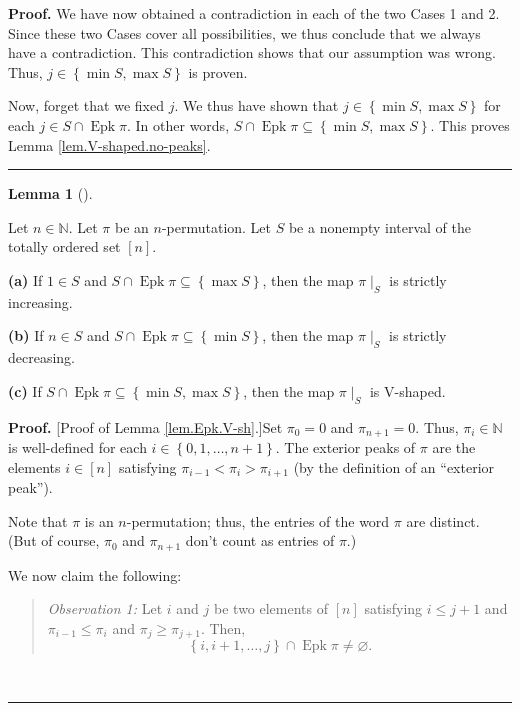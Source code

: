 \documentclass[numbers=enddot,12pt,final,onecolumn,notitlepage]{scrartcl}%
\theoremstyle{definition}
\newtheorem{lem}[theo]{Lemma}
\newenvironment{lemma}[1][]
{\begin{lem}[#1]\begin{leftbar}}
{\end{leftbar}\end{lem}}
\newenvironment{statement}{\begin{quote}}{\end{quote}}
\newenvironment{proof}[1][Proof]{\noindent\textbf{#1.} }{\ \rule{0.5em}{0.5em}}
\newenvironment{verlong}{}{}
\begin{document}
\begin{verlong}
\begin{proof}
We have now obtained a contradiction in each of the two Cases 1 and 2. Since
these two Cases cover all possibilities, we thus conclude that we always have
a contradiction. This contradiction shows that our assumption was wrong. Thus,
$j\in\left\{  \min S,\max S\right\}  $ is proven.

Now, forget that we fixed $j$. We thus have shown that $j\in\left\{  \min
S,\max S\right\}  $ for each $j\in S\cap\operatorname{Epk}\pi$. In other
words, $S\cap\operatorname{Epk}\pi\subseteq\left\{  \min S,\max S\right\}  $.
This proves Lemma \ref{lem.V-shaped.no-peaks}.
\end{proof}

\begin{lemma}
\label{lem.Epk.V-sh}Let $n\in\mathbb{N}$. Let $\pi$ be an $n$-permutation. Let
$S$ be a nonempty interval of the totally ordered set $\left[  n\right]  $.

\textbf{(a)} If $1\in S$ and $S\cap\operatorname{Epk}\pi\subseteq\left\{
\max S\right\}  $, then the map $\pi\mid_{S}$ is strictly increasing.

\textbf{(b)} If $n\in S$ and $S\cap\operatorname{Epk}\pi\subseteq\left\{
\min S\right\}  $, then the map $\pi\mid_{S}$ is strictly decreasing.

\textbf{(c)} If $S\cap\operatorname{Epk}\pi\subseteq\left\{  \min S,\max
S\right\}  $, then the map $\pi\mid_{S}$ is V-shaped.
\end{lemma}

\begin{proof}
[Proof of Lemma \ref{lem.Epk.V-sh}.]Set $\pi_{0}=0$ and $\pi_{n+1}=0$. Thus,
$\pi_{i}\in\mathbb{N}$ is well-defined for each $i\in\left\{  0,1,\ldots
,n+1\right\}  $. The exterior peaks of $\pi$ are the elements $i\in\left[
n\right]  $ satisfying $\pi_{i-1}<\pi_{i}>\pi_{i+1}$ (by the definition of an
\textquotedblleft exterior peak\textquotedblright).

Note that $\pi$ is an $n$-permutation; thus, the entries of the word $\pi$ are
distinct. (But of course, $\pi_{0}$ and $\pi_{n+1}$ don't count as entries of
$\pi$.)

We now claim the following:

\begin{statement}
\textit{Observation 1:} Let $i$ and $j$ be two elements of $\left[  n\right]
$ satisfying $i\leq j+1$ and $\pi_{i-1}\leq\pi_{i}$ and $\pi_{j}\geq\pi_{j+1}%
$. Then,%
\[
\left\{  i,i+1,\ldots,j\right\}  \cap\operatorname{Epk}\pi\neq\varnothing.
\]

\end{statement}


\end{proof}
\end{verlong}
\end{document}
